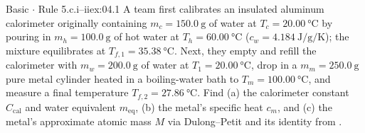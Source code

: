 \begin{workedexample}{Basic $\cdot$ Rule 5.c.i--ii}{ex:04.1}
A team first calibrates an insulated aluminum calorimeter originally containing $m_c = \SI{150.0}{\gram}$ of water at $T_c = \SI{20.00}{\celsius}$ by pouring in $m_h = \SI{100.0}{\gram}$ of hot water at $T_h = \SI{60.00}{\celsius}$ ($c_w = \SI{4.184}{\joule\per\gram\per\kelvin}$); the mixture equilibrates at $T_{f,1} = \SI{35.38}{\celsius}$. Next, they empty and refill the calorimeter with $m_w = \SI{200.0}{\gram}$ of water at $T_1 = \SI{20.00}{\celsius}$, drop in a $m_m = \SI{250.0}{\gram}$ pure metal cylinder heated in a boiling-water bath to $T_m = \SI{100.00}{\celsius}$, and measure a final temperature $T_{f,2} = \SI{27.86}{\celsius}$. Find (a) the calorimeter constant $C_{\mathrm{cal}}$ and water equivalent $m_{\mathrm{eq}}$, (b) the metal's specific heat $c_m$, and (c) the metal's approximate atomic mass $M$ via Dulong--Petit and its identity from .


\end{workedexample}
